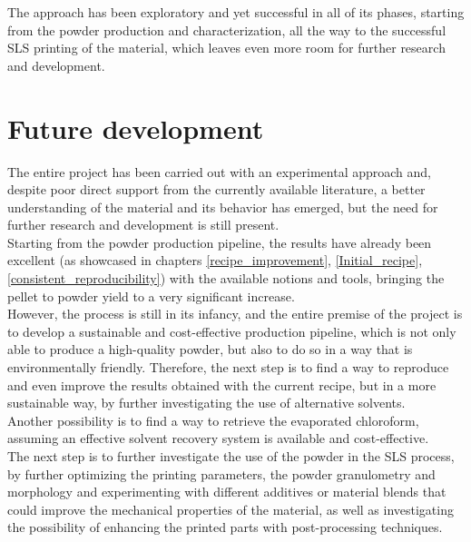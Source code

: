 \documentclass{article}
\begin{document}
    The approach has been exploratory and yet successful in all of its phases, starting from the powder production and characterization, all the way to the successful 
    SLS printing of the material, which leaves even more room for further research and development. 
    

    \clearpage
    \section{Future development\label{Future_development_and_research}}

    The entire project has been carried out with an experimental approach and, despite poor direct support 
    from the currently available literature, a better understanding of 
    the material and its behavior has emerged, but the need for further research and development is still 
    present. \\ 

    Starting from the powder production pipeline, the results have already been excellent (as showcased in chapters \ref{recipe_improvement}, \ref{Initial_recipe}, 
    \ref{consistent_reproducibility}) with the available notions and tools, bringing the pellet to powder yield to 
    a very significant increase. \\ 

    However, the process is still in its infancy, and the entire premise of the project is to develop a sustainable 
    and cost-effective production pipeline, which is not only able to produce a high-quality powder, but also 
    to do so in a way that is environmentally friendly. Therefore, the next step is to find a way to reproduce and 
    even improve the results obtained with the current recipe, but in a more sustainable way, by further 
    investigating the use of alternative solvents. \\ 

    Another possibility is to find a way to retrieve the evaporated chloroform, assuming an effective solvent recovery 
    system is available and cost-effective. \\ 

    The next step is to further investigate the use of the powder in the SLS process, by further optimizing the 
    printing parameters, the powder granulometry and morphology and experimenting with different additives or material blends that 
    could improve the mechanical properties of the material, as well as investigating the possibility of enhancing the printed parts 
    with post-processing techniques. \\ 


    \clearpage


    \printbibliography
\end{document}
